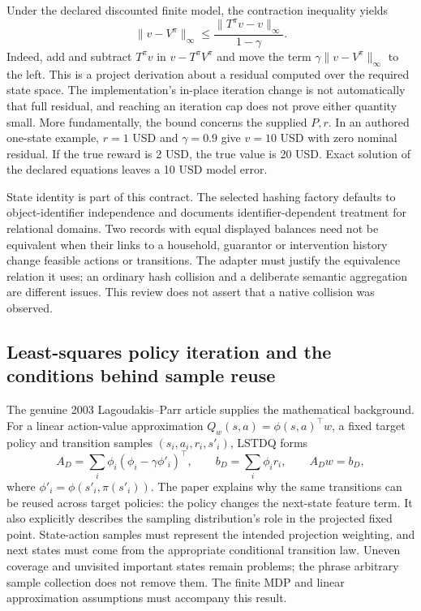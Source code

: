 Under the declared discounted finite model, the contraction inequality yields
\[
 \|v-V^\pi\|_\infty\leq
 \frac{\|T^\pi v-v\|_\infty}{1-\gamma}.
\]
Indeed, add and subtract $T^\pi v$ in $v-T^\pi V^\pi$ and move the term $\gamma\|v-V^\pi\|_\infty$ to the left. This is a project derivation about a residual computed over the required state space. The implementation's in-place iteration change is not automatically that full residual, and reaching an iteration cap does not prove either quantity small. More fundamentally, the bound concerns the supplied $P,r$. In an authored one-state example, $r=1$ USD and $\gamma=0.9$ give $v=10$ USD with zero nominal residual. If the true reward is 2 USD, the true value is 20 USD. Exact solution of the declared equations leaves a 10 USD model error.~\citep{exec24_policyjava_comparison}

State identity is part of this contract. The selected hashing factory defaults to object-identifier independence and documents identifier-dependent treatment for relational domains. Two records with equal displayed balances need not be equivalent when their links to a household, guarantor or intervention history change feasible actions or transitions. The adapter must justify the equivalence relation it uses; an ordinary hash collision and a deliberate semantic aggregation are different issues. This review does not assert that a native collision was observed.~\citep{exec24_policyjava_burlap}

\subsection{Least-squares policy iteration and the conditions behind sample reuse}
The genuine 2003 Lagoudakis--Parr article supplies the mathematical background. For a linear action-value approximation $Q_w(s,a)=\phi(s,a)^\top w$, a fixed target policy and transition samples $(s_i,a_i,r_i,s'_i)$, LSTDQ forms
\[
 A_D=\sum_i\phi_i(\phi_i-\gamma\phi'_i)^\top,
 \qquad b_D=\sum_i\phi_i r_i,
 \qquad A_Dw=b_D,
\]
where $\phi'_i=\phi(s'_i,\pi(s'_i))$. The paper explains why the same transitions can be reused across target policies: the policy changes the next-state feature term. It also explicitly describes the sampling distribution's role in the projected fixed point. State-action samples must represent the intended projection weighting, and next states must come from the appropriate conditional transition law. Uneven coverage and unvisited important states remain problems; the phrase arbitrary sample collection does not remove them. The finite MDP and linear approximation assumptions must accompany this result.~\citep{exec24_policyjava_lspi}

